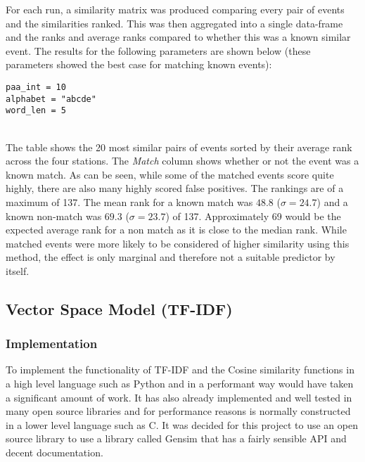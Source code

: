 \documentclass[../report.tex]{subfiles}
\begin{document}
	For each run, a similarity matrix was produced comparing every pair of events and the similarities ranked.  This was then aggregated into a single data-frame and the ranks and average ranks compared to whether this was a known similar event.  The results for the following parameters are shown below (these parameters showed the best case for matching known events):
	
\begin{verbatim}
paa_int = 10
alphabet = "abcde"
word_len = 5
\end{verbatim}

\\

	The table shows the 20 most similar pairs of events sorted by their average rank across the four stations.  The \textit{Match} column shows whether or not the event was a known match.  As can be seen, while some of the matched events score quite highly, there are also many highly scored false positives.  The rankings are of a maximum of 137.  The mean rank for a known match was $48.8$ ($\sigma = 24.7$) and a known non-match was $69.3$ ($\sigma = 23.7$) of 137.  Approximately 69 would be the expected average rank for a non match as it is close to the median rank.  While matched events were more likely to be considered of higher similarity using this method, the effect is only marginal and therefore not a suitable predictor by itself.

\subsection{Vector Space Model (TF-IDF)} \label{sec:vsm-impl}
\subsubsection{Implementation}

	To implement the functionality of TF-IDF and the Cosine similarity functions in a high level language such as Python and in a performant way would have taken a significant amount of work.  It has also already implemented and well tested in many open source libraries and for performance reasons is normally constructed in a lower level language such as C.  It was decided for this project to use an open source library to use a library called Gensim \citep{rehurek_lrec} that has a fairly sensible API and decent documentation.
	
\end{document}
